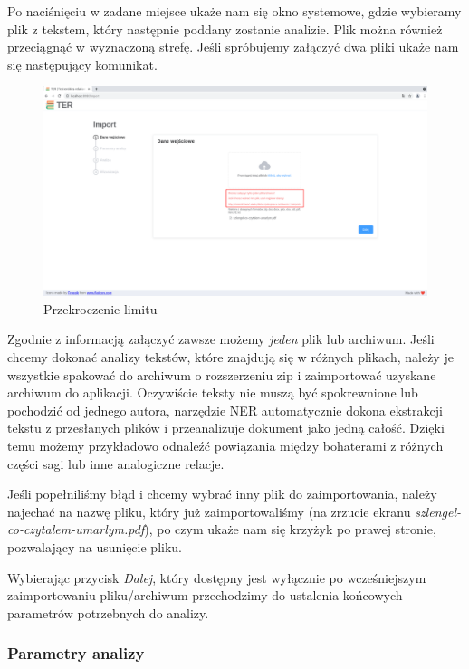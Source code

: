 \documentclass[12pt, a4paper]{article}
\begin{document}
Po naciśnięciu w zadane miejsce ukaże nam się okno systemowe, gdzie wybieramy plik z tekstem, który następnie poddany zostanie analizie. Plik można również przeciągnąć w wyznaczoną strefę. Jeśli spróbujemy załączyć dwa pliki ukaże nam się następujący komunikat.

\begin{figure}[H]
    \centering
    \includegraphics[width=\linewidth]{images/import-error.png}
    \caption{Przekroczenie limitu}
\end{figure}

Zgodnie z informacją załączyć zawsze możemy \textit{jeden} plik lub archiwum. Jeśli chcemy dokonać analizy tekstów, które znajdują się w różnych plikach, należy je wszystkie spakować do archiwum o rozszerzeniu zip i zaimportować uzyskane archiwum do aplikacji. Oczywiście teksty nie muszą być spokrewnione lub pochodzić od jednego autora, narzędzie NER automatycznie dokona ekstrakcji tekstu z przesłanych plików i przeanalizuje dokument jako jedną całość. Dzięki temu możemy przykładowo odnaleźć powiązania między bohaterami z różnych części sagi lub inne analogiczne relacje.

Jeśli popełniliśmy błąd i chcemy wybrać inny plik do zaimportowania, należy najechać na nazwę pliku, który już zaimportowaliśmy (na zrzucie ekranu \textit{szlengel-co-czytalem-umarlym.pdf}), po czym ukaże nam się krzyżyk po prawej stronie, pozwalający na usunięcie pliku.

Wybierając przycisk \textit{Dalej}, który dostępny jest wyłącznie po wcześniejszym zaimportowaniu pliku/archiwum przechodzimy do ustalenia końcowych parametrów potrzebnych do analizy.

\subsubsection{Parametry analizy}\label{parametry-analizy}
\end{document}
